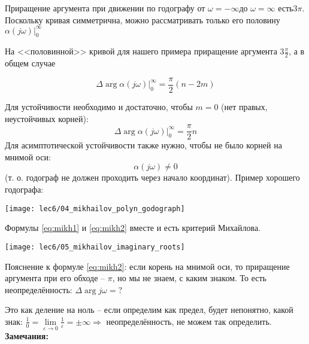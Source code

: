 \documentclass[main.tex]{subfiles}
\begin{document}
Приращение аргумента при движении по годографу от $ \omega = - \infty $до $ \omega = \infty $ есть$ 3 \pi $.
Поскольку кривая симметрична, можно рассматривать только его половину $ \alpha(j \omega) |_0^\infty $

На <<половинной>> кривой для нашего примера приращение аргумента $ 3\frac{\pi}{2} $, а в общем случае

\begin{equation}\label{eq:mikhailov}
	\boxed{ \Delta \arg \alpha (j \omega) |_0^\infty = \frac{\pi}{2} (n - 2m) }
\end{equation}

Для устойчивости необходимо и достаточно, чтобы $ m = 0 $ (нет правых, неустойчивых корней):
\begin{equation}\label{eq:mikh1}
\boxed{ \Delta \arg \alpha(j \omega) |_0^\infty = \frac{\pi}{2} n }
\end{equation}
Для асимптотической устойчивости также нужно, чтобы не было корней на мнимой оси:
\begin{equation}\label{eq:mikh2}
	\boxed{ \alpha(j \omega) \ne 0 }
\end{equation}
(т. о. годограф не должен проходить через начало координат). Пример хорошего годографа:

\texttt{[image: lec6/04\_mikhailov\_polyn\_godograph]}

Формулы \eqref{eq:mikh1} и \eqref{eq:mikh2} вместе и есть критерий Михайлова.

\texttt{[image: lec6/05\_mikhailov\_imaginary\_roots]}

Пояснение к формуле \eqref{eq:mikh2}:
если корень на мнимой оси, то приращение аргумента при его обходе -- $\pi$, но мы не знаем, с каким знаком.
То есть неопределённость: $ \Delta \arg j \omega = ? $

Это как деление на ноль -- если определим как предел, будет непонятно, какой знак: $ \frac{1}{0} = \lim\limits_{\varepsilon \to 0} \frac{1}{\varepsilon} = \pm \infty \Rightarrow $ неопределённость, не можем так определить. \\

\textbf{Замечания:}
\end{document}
